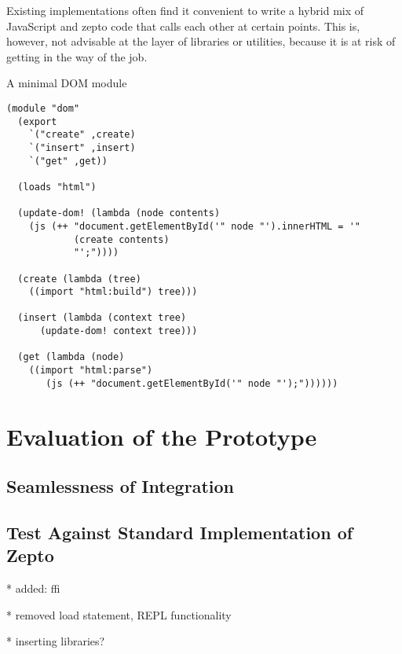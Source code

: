 \documentclass[oneside,11pt,xetex]{scrbook}
\begin{document}
Existing implementations often find it convenient to write a hybrid mix
of JavaScript and zepto code that calls each other at certain points.
This is, however, not advisable at the layer of libraries or utilities,
because it is at risk of getting in the way of the job.

\begin{listing}[H]
\caption{A minimal DOM module}
\begin{verbatim}
(module "dom"
  (export
    `("create" ,create)
    `("insert" ,insert)
    `("get" ,get))

  (loads "html")

  (update-dom! (lambda (node contents)
    (js (++ "document.getElementById('" node "').innerHTML = '"
            (create contents)
            "';"))))

  (create (lambda (tree)
    ((import "html:build") tree)))

  (insert (lambda (context tree)
      (update-dom! context tree)))

  (get (lambda (node)
    ((import "html:parse")
       (js (++ "document.getElementById('" node "');"))))))
\end{verbatim}
\end{listing}

\clearpage

\chapter{Evaluation of the Prototype}
\label{chap:evaluation}

\section{Seamlessness of Integration}

\section{Test Against Standard Implementation of Zepto}

* added: ffi

* removed load statement, REPL functionality

* inserting libraries?
\end{document}
